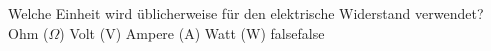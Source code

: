     {Welche Einheit wird üblicherweise für den elektrische Widerstand verwendet?}
    {Ohm ($\Omega$)}
    {Volt (V)}
    {Ampere (A)}
    {Watt (W)}
    {false}{false}